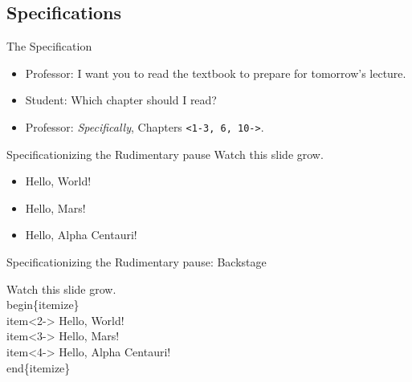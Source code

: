 \documentclass[pdf]{beamer}
\begin{document}
\subsection{Specifications}

\begin{frame}[fragile]{The Specification}
\begin{itemize}
\item<+-| alert@1-> Professor: I want you to read the textbook to prepare for tomorrow's lecture.
\item<+-> Student: Which chapter should I read?
\item<+-| alert@3-> Professor: \textit{Specifically}, Chapters \LARGE{\verb=<1-3, 6, 10->=}.
\end{itemize}
\end{frame}

\begin{frame}{Specificationizing the Rudimentary pause}
Watch this slide grow.
\begin{itemize}
	\item<2-> Hello, World!
	\item<3-> Hello, Mars!
	\item<4-> Hello, Alpha Centauri!
\end{itemize}
\end{frame}

\begin{frame}[fragile]{Specificationizing the Rudimentary pause: Backstage}
\begin{semiverbatim}
Watch this slide grow.
\\begin\{itemize\}
  \alert{\\item<2->} Hello, World!
  \alert{\\item<3->} Hello, Mars!
  \alert{\\item<4->} Hello, Alpha Centauri!
\\end\{itemize\}
\end{semiverbatim}
\end{frame}
\end{document}
